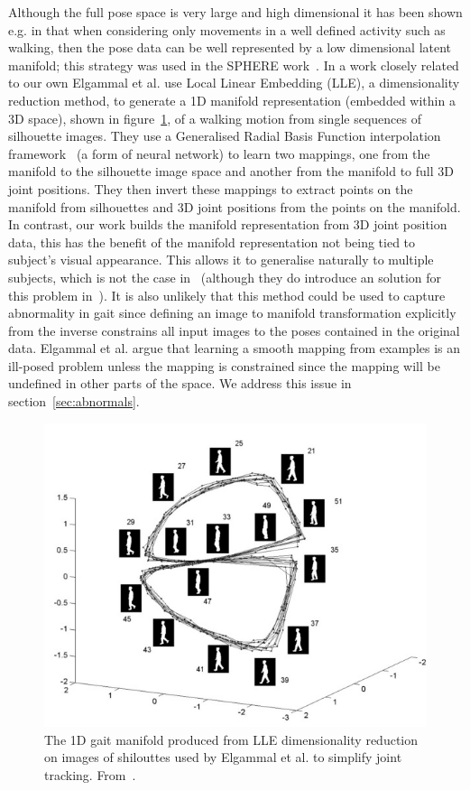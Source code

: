 \documentclass[11pt]{article} %
\begin{document}
Although the full pose space is very large and high dimensional it has been shown e.g. in \cite{Brand1999,Elgammal2004} that when considering only movements in a well defined activity such as walking, then the pose data can be well represented by a low dimensional latent manifold; this strategy was used in the SPHERE work~\cite{Paiement}. In a work closely related to our own Elgammal et al. \cite{Elgammal2004} use Local Linear Embedding (LLE), a dimensionality reduction method, to generate a 1D manifold representation (embedded within a 3D space), shown in figure~\ref{fig:elg}, of a walking motion from single sequences of silhouette images. They use a Generalised Radial Basis Function interpolation framework~\cite{Poggio1990} (a form of neural network) to learn two mappings, one from the manifold to the silhouette image space and another from the manifold to full 3D joint positions. They then invert these mappings to extract points on the manifold from silhouettes and 3D joint positions from the points on the manifold. In contrast, our work builds the manifold representation from 3D joint position data, this has the benefit of the manifold representation not being tied to subject's visual appearance. This allows it to generalise naturally to multiple subjects, which is not the case in~\cite{Elgammal2004} (although they do introduce an solution for this problem in~\cite{Elgammal2004b}). It is also unlikely that this method could be used to capture abnormality in gait since defining an image to manifold transformation explicitly from the inverse constrains all input images to the poses contained in the original data. Elgammal et al. argue that learning a smooth mapping from examples is an ill-posed problem unless the mapping is constrained since the mapping will be undefined in other parts of the space. We address this issue in section~\ref{sec:abnormals}.
\begin{figure}
\centering
\includegraphics*[width=0.6\linewidth,clip]{elgamel}
\caption{ The 1D gait manifold produced from LLE dimensionality reduction on images of shilouttes used by Elgammal et al. to simplify joint tracking. From~\cite{Elgammal2004}. \label{fig:elg}  } 
\end{figure}
\end{document}
